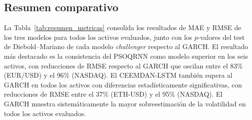 \documentclass[12pt]{paper}
\begin{document}
\subsection{Resumen comparativo}

La Tabla~\ref{tab:resumen_metricas} consolida los resultados de MAE y RMSE de los tres modelos para todos los activos evaluados, junto con los $p$-valores del test de Diebold--Mariano de cada modelo \textit{challenger} respecto al GARCH. El resultado más destacado es la consistencia del PSOQRNN como modelo superior en los seis activos, con reducciones de RMSE respecto al GARCH que oscilan entre el 83\% (EUR/USD) y el 96\% (NASDAQ). El CEEMDAN-LSTM también supera al GARCH en todos los activos con diferencias estadísticamente significativas, con reducciones de RMSE entre el 37\% (ETH-USD) y el 95\% (NASDAQ). El GARCH muestra sistemáticamente la mayor sobreestimación de la volatilidad en todos los activos evaluados.
\end{document}
